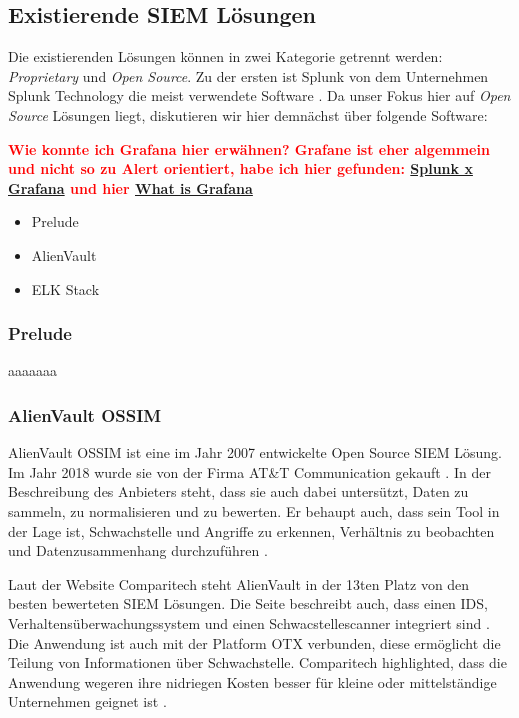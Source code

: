 \subsection{Existierende SIEM Lösungen}

Die existierenden  Lösungen können in zwei Kategorie getrennt werden: \textit{\gls{Proprietary}} und \textit{\gls{Open Source}}. Zu der ersten ist Splunk von dem Unternehmen Splunk Technology die meist verwendete Software \citep{Kazarov_Splunk}. Da unser Fokus hier auf \textit{\gls{Open Source}} Lösungen liegt, diskutieren wir hier demnächst über folgende Software:

\textbf{\textcolor{red}{Wie konnte ich Grafana hier erwähnen? Grafane ist eher algemmein und nicht so zu Alert orientiert, habe ich hier gefunden: \href{https://www.metricfire.com/blog/grafana-vs-splunk/}{Splunk x Grafana} und hier \href{https://www.researchgate.net/publication/350730340_Implementation_of_Grafana_as_open_source_visualization_and_query_processing_platform_for_data_scientists_and_researchers}{What is Grafana}}  }

\begin{itemize}[noitemsep]
   \item Prelude
   \item AlienVault
   \item ELK Stack
\end{itemize}

\subsubsection{Prelude}
aaaaaaa

\subsubsection{AlienVault OSSIM}
AlienVault OSSIM ist eine im Jahr 2007 entwickelte \gls{Open Source} SIEM Lösung. Im Jahr 2018 wurde sie von der Firma AT\&T Communication gekauft \citep{CBN_AV}. In der Beschreibung des Anbieters steht, dass sie auch dabei untersützt, Daten zu sammeln, zu normalisieren und zu bewerten. Er behaupt auch, dass sein Tool in der Lage ist, Schwachstelle und Angriffe zu erkennen, Verhältnis zu beobachten und Datenzusammenhang durchzuführen \citep{ATT_AVO}.

Laut der Website Comparitech steht AlienVault in der 13ten Platz von den besten bewerteten \gls{SIEM} Lösungen. Die Seite beschreibt auch, dass einen \gls{IDS}, Verhaltensüberwachungssystem und einen Schwacstellescanner integriert sind . Die Anwendung ist auch mit der Platform \gls{OTX} verbunden, diese ermöglicht die Teilung von Informationen über Schwachstelle. Comparitech highlighted, dass die Anwendung wegeren ihre nidriegen Kosten besser für kleine oder mittelständige Unternehmen geignet ist \citep{comparitech_SIEM}. 

